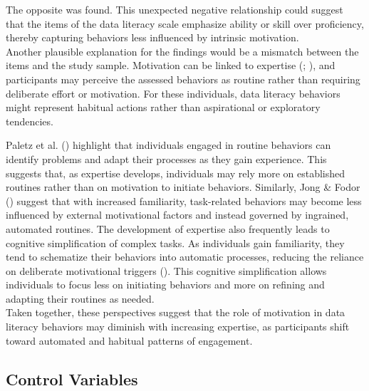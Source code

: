 \documentclass[
  12pt,
  a4paper,
  twoside]{article}
\begin{document}
The opposite was found.
This unexpected negative relationship could suggest that the items of the data literacy scale emphasize ability or skill over proficiency, thereby capturing behaviors less influenced by intrinsic motivation.\\
Another plausible explanation for the findings would be a mismatch between the items and the study sample. Motivation can be linked to expertise (; ), and participants may perceive the assessed behaviors as routine rather than requiring deliberate effort or motivation. For these individuals, data literacy behaviors might represent habitual actions rather than aspirational or exploratory tendencies.

Paletz et al. () highlight that individuals engaged in routine behaviors can identify problems and adapt their processes as they gain experience. This suggests that, as expertise develops, individuals may rely more on established routines rather than on motivation to initiate behaviors. Similarly, Jong \& Fodor () suggest that with increased familiarity, task-related behaviors may become less influenced by external motivational factors and instead governed by ingrained, automated routines.
The development of expertise also frequently leads to cognitive simplification of complex tasks. As individuals gain familiarity, they tend to schematize their behaviors into automatic processes, reducing the reliance on deliberate motivational triggers (). This cognitive simplification allows individuals to focus less on initiating behaviors and more on refining and adapting their routines as needed.\\
Taken together, these perspectives suggest that the role of motivation in data literacy behaviors may diminish with increasing expertise, as participants shift toward automated and habitual patterns of engagement.

\subsection{Control Variables}\label{control-variables-1}
\end{document}
